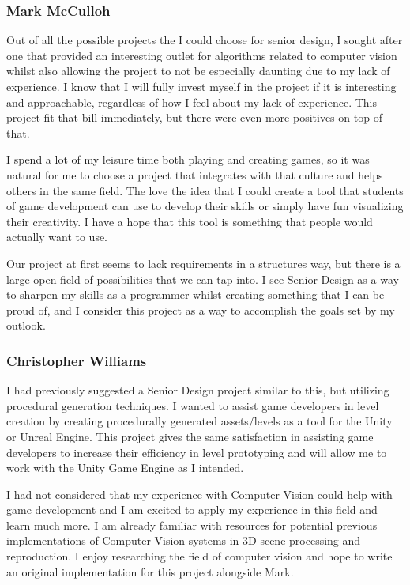 \documentclass[12pt]{article}
\begin{document}
\subsubsection{Mark McCulloh}\label{mark-mcculloh}

Out of all the possible projects the I could choose for senior design, I
sought after one that provided an interesting outlet for algorithms
related to computer vision whilst also allowing the project to not be
especially daunting due to my lack of experience. I know that I will
fully invest myself in the project if it is interesting and
approachable, regardless of how I feel about my lack of experience. This
project fit that bill immediately, but there were even more positives on
top of that.

I spend a lot of my leisure time both playing and creating games, so it
was natural for me to choose a project that integrates with that culture
and helps others in the same field. The love the idea that I could
create a tool that students of game development can use to develop their
skills or simply have fun visualizing their creativity. I have a hope
that this tool is something that people would actually want to use.

Our project at first seems to lack requirements in a structures way, but
there is a large open field of possibilities that we can tap into. I see
Senior Design as a way to sharpen my skills as a programmer whilst
creating something that I can be proud of, and I consider this project
as a way to accomplish the goals set by my outlook.

\subsubsection{Christopher Williams}\label{christopher-williams}

I had previously suggested a Senior Design project similar to this, but
utilizing procedural generation techniques. I wanted to assist game
developers in level creation by creating procedurally generated
assets/levels as a tool for the Unity or Unreal Engine. This project
gives the same satisfaction in assisting game developers to increase
their efficiency in level prototyping and will allow me to work with the
Unity Game Engine as I intended.

I had not considered that my experience with Computer Vision could help
with game development and I am excited to apply my experience in this
field and learn much more. I am already familiar with resources for
potential previous implementations of Computer Vision systems in 3D
scene processing and reproduction. I enjoy researching the field of
computer vision and hope to write an original implementation for this
project alongside Mark.
\end{document}

